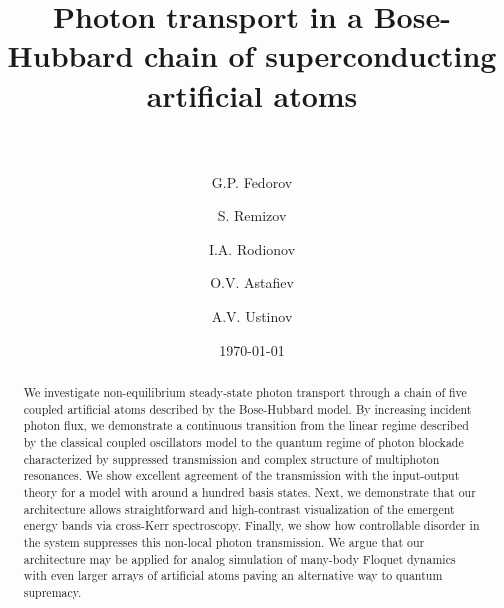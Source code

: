 \documentclass[%
 aps, pra,
 amsmath,amssymb,
 reprint,%
superscriptaddress
]{revtex4-2}
\newcommand{\mytitile}{Photon transport in a Bose-Hubbard chain of superconducting artificial atoms}
\begin{document}
	
	\title[\mytitile]{\mytitile\\~}
	\author{G.P. Fedorov}
	
	\author{S. Remizov}

	\author{I.A. Rodionov}

	\author{O.V. Astafiev}

	\author{A.V. Ustinov}
	
	
	\date{\today}%
	
	
	\begin{abstract}
We investigate non-equilibrium steady-state photon transport through a chain of five coupled artificial atoms described by the Bose-Hubbard model. By increasing incident photon flux, we demonstrate a continuous transition from the linear regime described by the classical coupled oscillators model to the quantum regime of photon blockade characterized by suppressed transmission and complex structure of multiphoton resonances. We show excellent agreement of the transmission with the input-output theory for a model with around a hundred basis states. Next, we demonstrate that our architecture allows straightforward and high-contrast visualization of the emergent energy bands via cross-Kerr spectroscopy. Finally, we show how controllable disorder in the system suppresses this non-local photon transmission. We argue that our architecture may be applied for analog simulation of many-body Floquet dynamics with even larger arrays of artificial atoms paving an alternative way to quantum supremacy.
\end{abstract}
	
\end{document}
